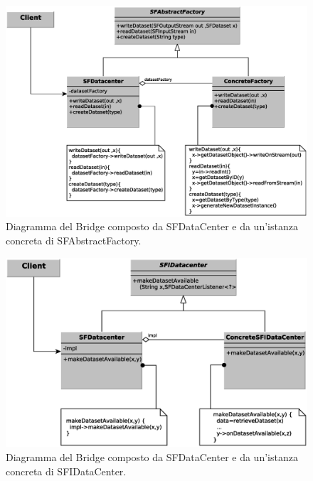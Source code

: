 \begin{figure}
\begin{center}
\includegraphics[width=\textwidth]{Immagini/DataCenterfactory}
\caption[Bridge composto da SFDataCenter e SFAbstractFactory.]{Diagramma del Bridge composto da SFDataCenter e da un'istanza concreta di SFAbstractFactory.\label{f:datacenterfactory}} 
\end{center} 
\end{figure}
\begin{figure}
\begin{center}
\includegraphics[width=\textwidth]{Immagini/DataCenter}
\caption[Bridge composto da SFDataCenter e SFIDataCenter.]{Diagramma del Bridge composto da SFDataCenter e da un'istanza concreta di SFIDataCenter.\label{f:datacenterimplementation}} 
\end{center} 
\end{figure}

